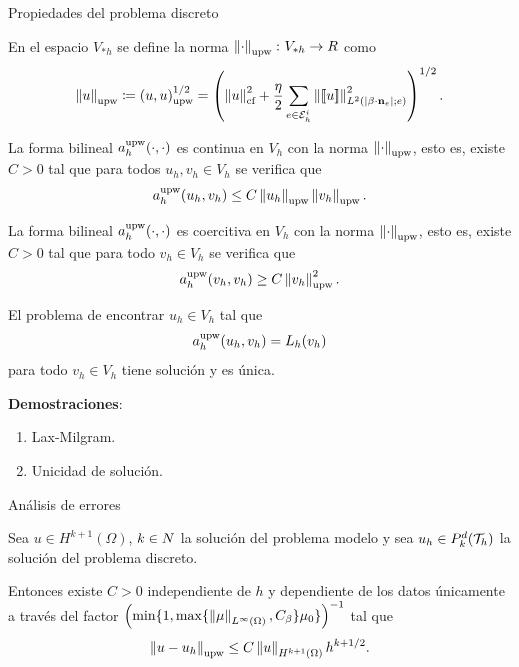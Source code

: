 	\begin{frame}[allowframebreaks]{Propiedades del problema discreto}
	\begin{definicion}
		En el espacio $V_{*h}$ se define la norma $\left\|\cdot\right\|_{\text{upw}}\colon V_{*h}\to\relax R$ como $$\left\|u\right\|_{\text{upw}}\coloneqq\left(u,u\right)_\text{upw}^{1/2}= \left(\left\|u\right\|_{\text{cf}}^2+\frac{\eta}{2}\sum_{e\in\mathcal{E}_h^i}\left\|\left[\!\left[u\right]\!\right]\right\|^2_{L^2(|\beta\cdot\mathbf{n}_e|;e)} \right)^{1/2}.$$
	\end{definicion}
	\framebreak
	\begin{lemma}
		La forma bilineal $a_h^{\text{upw}}(\cdot,\cdot)$ es continua en $V_h$ con la norma $\left\|\cdot\right\|_{\text{upw}}$, esto es, existe $C>0$ tal que para todos $u_h,v_h\in V_h$ se verifica que $$a_h^{\text{upw}}(u_h,v_h)\leq C\left\|u_h\right\|_{\text{upw}}\left\|v_h\right\|_{\text{upw}}.$$
	\end{lemma}
	
	\begin{proposition}
		La forma bilineal $a_h^{\text{upw}}(\cdot,\cdot)$ es coercitiva en $V_h$ con la norma $\left\|\cdot\right\|_{\text{upw}}$, esto es, existe $C>0$ tal que para todo $v_h\in V_h$ se verifica que $$a_h^{\text{upw}}(v_h,v_h)\geq C\left\|v_h\right\|_{\text{upw}}^2.$$
	\end{proposition}
	\framebreak
	\begin{lemma}
		El problema de encontrar $u_h\in V_h$ tal que $$a_h^{\text{upw}}(u_h,v_h)=L_h(v_h)$$ para todo $v_h\in V_h$ tiene solución y es única.
	\end{lemma}
	\textbf{Demostraciones}:
	\begin{enumerate}
		\item Lax-Milgram.
		\item Unicidad de solución.
	\end{enumerate}
	\end{frame}
	
	\begin{frame}{Análisis de errores}
	\begin{theorem}
		\label{theorem:hiperbolico_UPW_orden_norma_UPW}
		Sea $u\in H^{k+1}(\Omega)$, $k\in\relax N$ la solución del problema modelo y sea $u_h\in \relax{P}_k^d(\mathcal{T}_h)$ la solución del problema discreto.
		
		Entonces existe $C>0$ independiente de $h$ y dependiente de los datos únicamente a través del factor $\left(\min\{1,\max\{\left\|\mu\right\|_{L^\infty(\Omega)},C_\beta\}\mu_0\}\right)^{-1}$ tal que $$\left\|u-u_h\right\|_{\text{upw}}\leq C\left\|u\right\|_{H^{k+1}(\Omega)}h^{k+1/2}.$$
	\end{theorem}
\end{frame}

